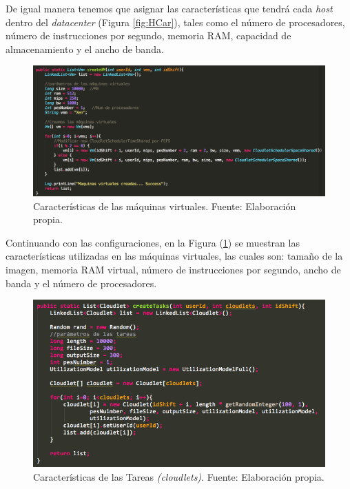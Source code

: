 De igual manera tenemos que asignar las caracter\'isticas que tendr\'a cada \textit{host} dentro del \textit{datacenter} (Figura \ref{fig:HCar}), tales como el n\'umero de procesadores, n\'umero de instrucciones por segundo, memoria RAM, capacidad de almacenamiento y el ancho de banda.

\newpage

\renewcommand\thefigure{\arabic{figure}}
\begin{figure}[h!]
	\centering
	\includegraphics[scale=0.3]{media/creacion_vm}
	\caption{Características de las máquinas virtuales. Fuente: Elaboración propia.}
	\label{fig:VCar}
\end{figure}


Continuando con las configuraciones, en la Figura (\ref{fig:VCar}) se muestran las caracter\'isticas utilizadas en las m\'aquinas virtuales, las cuales son: tamaño de la imagen, memoria RAM virtual, n\'umero de instrucciones por segundo, ancho de banda y el n\'umero de procesadores.


\renewcommand\thefigure{\arabic{figure}}
\begin{figure}[h!]
	\centering
	\includegraphics[scale=0.5]{media/CloudletCreateTask}
	\caption{Características de las Tareas \textit{(cloudlets)}. Fuente: Elaboración propia.}
	\label{fig:TCar}
\end{figure} 


